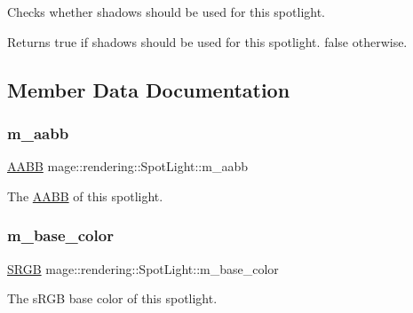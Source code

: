 Checks whether shadows should be used for this spotlight.

\begin{DoxyReturn}{Returns}
{\ttfamily true} if shadows should be used for this spotlight. {\ttfamily false} otherwise. 
\end{DoxyReturn}


\subsection{Member Data Documentation}
\hypertarget{classmage_1_1rendering_1_1_spot_light_a8d79d322ce7d394d4de201478350d795}{}\label{classmage_1_1rendering_1_1_spot_light_a8d79d322ce7d394d4de201478350d795} 
\subsubsection{\texorpdfstring{m\+\_\+aabb}{m\_aabb}}
{\footnotesize\ttfamily \hyperlink{classmage_1_1_a_a_b_b}{A\+A\+BB} mage\+::rendering\+::\+Spot\+Light\+::m\+\_\+aabb\hspace{0.3cm}{\ttfamily [private]}}

The \hyperlink{classmage_1_1_a_a_b_b}{A\+A\+BB} of this spotlight. \hypertarget{classmage_1_1rendering_1_1_spot_light_a79bbd00a892a19738361a52ed875f906}{}\label{classmage_1_1rendering_1_1_spot_light_a79bbd00a892a19738361a52ed875f906} 
\subsubsection{\texorpdfstring{m\+\_\+base\+\_\+color}{m\_base\_color}}
{\footnotesize\ttfamily \hyperlink{structmage_1_1_s_r_g_b}{S\+R\+GB} mage\+::rendering\+::\+Spot\+Light\+::m\+\_\+base\+\_\+color\hspace{0.3cm}{\ttfamily [private]}}

The s\+R\+GB base color of this spotlight. \hypertarget{classmage_1_1rendering_1_1_spot_light_afcac44663ee8e8773eaa838ddbf9c0f2}{}\label{classmage_1_1rendering_1_1_spot_light_afcac44663ee8e8773eaa838ddbf9c0f2} 
